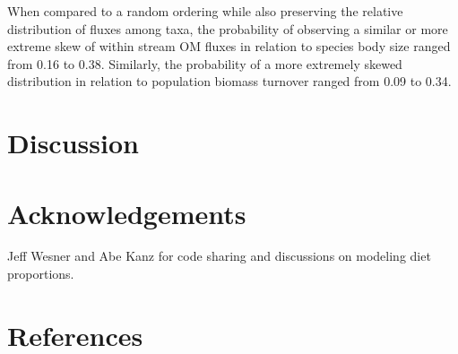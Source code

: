 \documentclass[
]{article}
\begin{document}
When compared to a random ordering while also preserving the relative
distribution of fluxes among taxa, the probability of observing a
similar or more extreme skew of within stream OM fluxes in relation to
species body size ranged from 0.16 to 0.38. Similarly, the probability
of a more extremely skewed distribution in relation to population
biomass turnover ranged from 0.09 to 0.34.

\hypertarget{discussion}{%
\section{Discussion}\label{discussion}}

\hypertarget{acknowledgements}{%
\section{Acknowledgements}\label{acknowledgements}}

Jeff Wesner and Abe Kanz for code sharing and discussions on modeling
diet proportions.

\hypertarget{references}{%
\section*{References}\label{references}}
\end{document}
